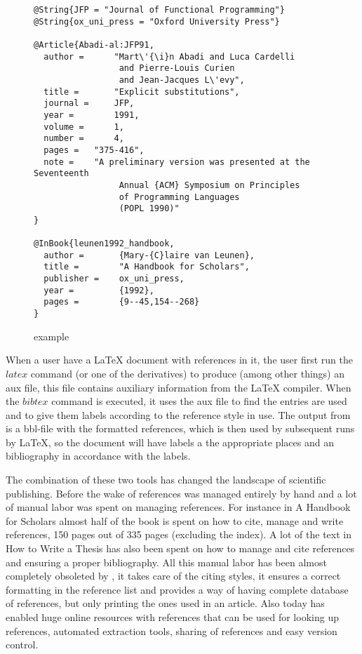 \begin{figure}[ht]
  \centering
  \begin{small}
\begin{verbatim}
@String{JFP = "Journal of Functional Programming"}
@String{ox_uni_press = "Oxford University Press"}

@Article{Abadi-al:JFP91,
  author =      "Mart\'{\i}n Abadi and Luca Cardelli
                 and Pierre-Louis Curien
                 and Jean-Jacques L\'evy",
  title =       "Explicit substitutions",
  journal =     JFP,
  year =        1991,
  volume =      1,
  number =      4,
  pages =	"375-416",
  note =	"A preliminary version was presented at the Seventeenth
                 Annual {ACM} Symposium on Principles
                 of Programming Languages
                 (POPL 1990)"
}

@InBook{leunen1992_handbook,
  author =       {Mary-{C}laire van Leunen},
  title =        "A Handbook for Scholars",
  publisher =    ox_uni_press,
  year =         {1992},
  pages =        {9--45,154--268}
}
\end{verbatim}
  \end{small}
  \caption{{\bibtex} example}
\label{fig:bibtex_example}
\end{figure}

When a user have a {\LaTeX} document with {\bibtex} references in it,
the user first run the $latex$ command (or one of the derivatives) to
produce (among other things) an aux file, this file contains auxiliary
information from the {\LaTeX} compiler.  When the $bibtex$ command is
executed, it uses the aux file to find the entries are used and to
give them labels according to the reference style in use.  The output
from {\bibtex} is a bbl-file with the formatted references, which is
then used by subsequent runs by {\LaTeX}, so the document will have
labels a the appropriate places and an bibliography in accordance
with the labels.

The combination of these two tools has changed the landscape of
scientific publishing.  Before the wake of {\bibtex} references was
managed entirely by hand and a lot of manual labor was spent on
managing references.  For instance in A Handbook for
Scholars\cite{leunen1992_handbook} almost half of the book is spent on
how to cite, manage and write references, 150 pages out of 335 pages
(excluding the index).  A lot of the text in How to Write a Thesis has
also been spent on how to manage and cite references and ensuring a
proper bibliography.  All this manual labor has been almost completely
obsoleted by {\bibtex}, it takes care of the citing styles, it ensures
a correct formatting in the reference list and provides a way of
having complete database of references, but only printing the ones
used in an article.  Also today {\bibtex} has enabled huge online
resources with references that can be used for looking up references,
automated extraction tools, sharing of references and easy version
control.


